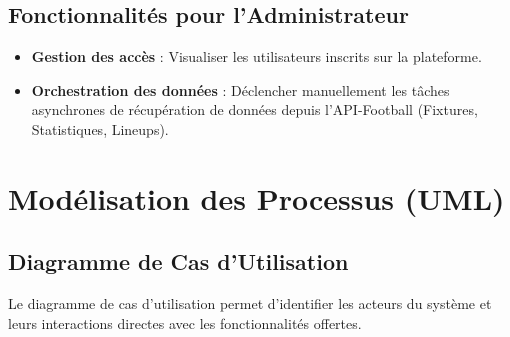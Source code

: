 \documentclass[12pt,a4paper,oneside]{book}
\begin{document}
\subsection{Fonctionnalités pour l'Administrateur}
\begin{itemize}
    \item \textbf{Gestion des accès} : Visualiser les utilisateurs inscrits sur la plateforme.
    \item \textbf{Orchestration des données} : Déclencher manuellement les tâches asynchrones de récupération de données depuis l'API-Football (Fixtures, Statistiques, Lineups).
\end{itemize}

\section{Modélisation des Processus (UML)}

\subsection{Diagramme de Cas d'Utilisation}
Le diagramme de cas d'utilisation permet d'identifier les acteurs du système et leurs interactions directes avec les fonctionnalités offertes.
\end{document}
